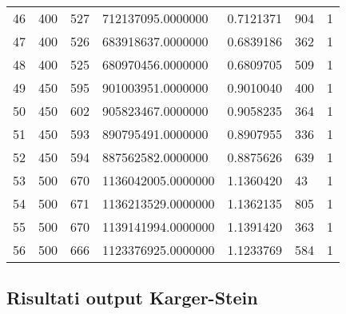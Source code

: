 \begin{longtable}[c]{lllllll}
  46 & 400 & 527 & 712137095.0000000 & 0.7121371 & 904 & 1 \\
  47 & 400 & 526 & 683918637.0000000 & 0.6839186 & 362 & 1 \\
  48 & 400 & 525 & 680970456.0000000 & 0.6809705 & 509 & 1 \\
  49 & 450 & 595 & 901003951.0000000 & 0.9010040 & 400 & 1 \\
  50 & 450 & 602 & 905823467.0000000 & 0.9058235 & 364 & 1 \\
  51 & 450 & 593 & 890795491.0000000 & 0.8907955 & 336 & 1 \\
  52 & 450 & 594 & 887562582.0000000 & 0.8875626 & 639 & 1 \\
  53 & 500 & 670 & 1136042005.0000000 & 1.1360420 & 43 & 1 \\
  54 & 500 & 671 & 1136213529.0000000 & 1.1362135 & 805 & 1 \\
  55 & 500 & 670 & 1139141994.0000000 & 1.1391420 & 363 & 1 \\
  56 & 500 & 666 & 1123376925.0000000 & 1.1233769 & 584 & 1
  \end{longtable}

\subsection{Risultati output Karger-Stein}

